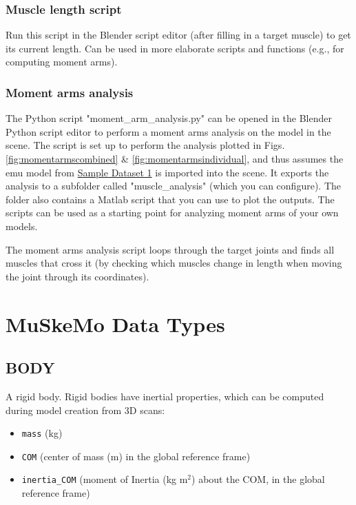 \documentclass{article}
\begin{document}
\subsubsection{Muscle length script}

Run this script in the Blender script editor (after filling in a target muscle) to get its current length. Can be used in more elaborate scripts and functions (e.g., for computing moment arms).


\subsubsection{Moment arms analysis}
The Python script "moment\_arm\_analysis.py" can be opened in the Blender Python script editor to perform a moment arms analysis on the model in the scene. The script is set up to perform the analysis plotted in Figs. \ref{fig:momentarmscombined} \& \ref{fig:momentarmsindividual}, and thus assumes the emu model from \href{https://github.com/PashavanBijlert/MuSkeMo/releases/tag/v0.x-sampledataset1}{Sample Dataset 1} is imported into the scene. It exports the analysis to a subfolder called "muscle\_analysis" (which you can configure). The folder also contains a Matlab script that you can use to plot the outputs. The scripts can be used as a starting point for analyzing moment arms of your own models.

The moment arms analysis script loops through the target joints and finds all muscles that cross it (by checking which muscles change in length when moving the joint through its coordinates).


\section{MuSkeMo Data Types}
\label{sec:DataTypes}



\subsection{BODY}
\label{sec:body}

A rigid body. Rigid bodies have inertial properties, which can be computed during model creation from 3D scans:

\begin{itemize}
    \item \texttt{mass} (kg)
    \item \texttt{COM} (center of mass (m) in the global reference frame)
    \item \texttt{inertia\_COM} (moment of Inertia (kg m\(^2\)) about the COM, in the global reference frame)
\end{itemize}
\end{document}
